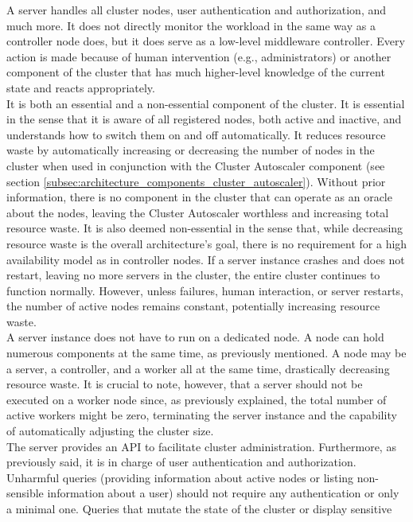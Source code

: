 A server handles all cluster nodes, user authentication and authorization, and much
more. It does not directly monitor the workload in the same way as a controller
node does, but it does serve as a low-level middleware controller. Every action
is made because of human intervention (e.g., administrators) or another
component of the cluster that has much higher-level knowledge of the current
state and reacts appropriately. \\ %
It is both an essential and a non-essential component of the cluster. It is essential
in the sense that it is aware of all registered nodes, both active and inactive,
and understands how to switch them on and off automatically. It reduces resource
waste by automatically increasing or decreasing the number of nodes in the
cluster when used in conjunction with the Cluster Autoscaler component (see section
\ref{subsec:architecture_components_cluster_autoscaler}). Without prior information,
there is no component in the cluster that can operate as an oracle about the
nodes, leaving the Cluster Autoscaler worthless and increasing total resource waste.
It is also deemed non-essential in the sense that, while decreasing resource waste
is the overall architecture's goal, there is no requirement for a high
availability model as in controller nodes. If a server instance crashes and does
not restart, leaving no more servers in the cluster, the entire cluster continues
to function normally. However, unless failures, human interaction, or server restarts,
the number of active nodes remains constant, potentially increasing resource waste.
\\ %
A server instance does not have to run on a dedicated node. A node can hold
numerous components at the same time, as previously mentioned. A node may be a
server, a controller, and a worker all at the same time, drastically decreasing resource
waste. It is crucial to note, however, that a server should not be executed on a
worker node since, as previously explained, the total number of active workers
might be zero, terminating the server instance and the capability of automatically
adjusting the cluster size. \\ %
The server provides an API to facilitate cluster administration. Furthermore, as
previously said, it is in charge of user authentication and authorization. Unharmful
queries (providing information about active nodes or listing non-sensible
information about a user) should not require any authentication or only a minimal
one. Queries that mutate the state of the cluster or display sensitive
